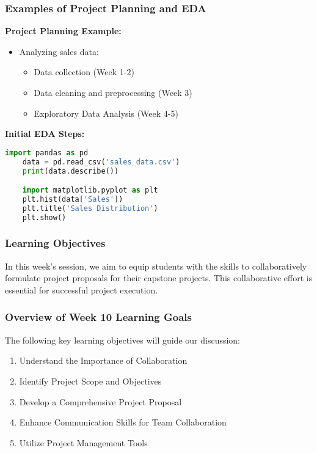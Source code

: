 \documentclass[aspectratio=169]{beamer}
\begin{document}
\begin{frame}[fragile]
    \frametitle{Examples of Project Planning and EDA}
    \textbf{Project Planning Example:}
    \begin{itemize}
        \item Analyzing sales data:
        \begin{itemize}
            \item Data collection (Week 1-2)
            \item Data cleaning and preprocessing (Week 3)
            \item Exploratory Data Analysis (Week 4-5)
        \end{itemize}
    \end{itemize}

    \textbf{Initial EDA Steps:}
    \begin{lstlisting}[language=Python]
    import pandas as pd
    data = pd.read_csv('sales_data.csv')
    print(data.describe())

    import matplotlib.pyplot as plt
    plt.hist(data['Sales'])
    plt.title('Sales Distribution')
    plt.show()
    \end{lstlisting}
\end{frame}

\begin{frame}[fragile]
    \frametitle{Learning Objectives}
    In this week's session, we aim to equip students with the skills to collaboratively formulate project proposals for their capstone projects. This collaborative effort is essential for successful project execution.
\end{frame}

\begin{frame}[fragile]
    \frametitle{Overview of Week 10 Learning Goals}
    The following key learning objectives will guide our discussion:
    \begin{enumerate}
        \item Understand the Importance of Collaboration
        \item Identify Project Scope and Objectives
        \item Develop a Comprehensive Project Proposal
        \item Enhance Communication Skills for Team Collaboration
        \item Utilize Project Management Tools
    \end{enumerate}
\end{frame}
\end{document}
